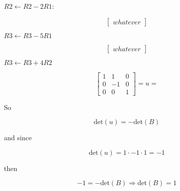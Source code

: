 \documentclass[twocolumn,draft]{article}
\begin{document}
  $R2 \leftarrow R2-2R1$:
  
  \begin{equation*}
  	\begin{bmatrix}
  		whatever 
  	\end{bmatrix} \tag*{$-$det(B)}
  \end{equation*}
  
  $R3\leftarrow R3-5R1$
  
  \begin{equation*}
  	\begin{bmatrix}
  		whatever 
  	\end{bmatrix} \tag*{$-$det(B)}
  \end{equation*}
  
  $R3\leftarrow R3 + 4R2$
  
  \begin{equation*}
  	\begin{bmatrix}
  		1 & 1 & 0 \\
		0 & -1 & 0 \\
		0 & 0 & 1
  	\end{bmatrix} = u = \tag*{$-$det(B)}
  \end{equation*}
  
  So
  
  \begin{equation*}
  	\text{det}(u) = -\text{det}(B)
  \end{equation*}
  
  and since
  
  \begin{equation*}
  	\text{det}(u) = 1\cdot -1\cdot 1 = -1
  \end{equation*}
  
  then 
  
  \begin{equation*}
  	-1 = -\text{det}(B) \Rightarrow \text{det}(B) = 1
  \end{equation*}

  
  
\end{document}
